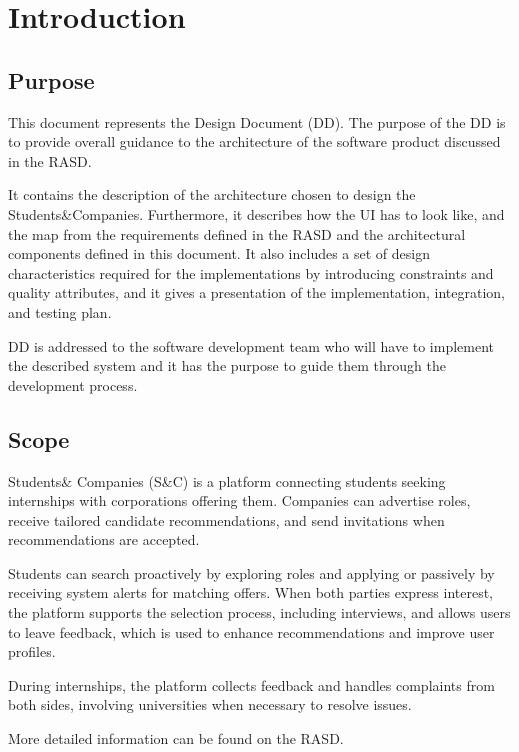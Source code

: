 \chapter{Introduction}

\section{Purpose}
This document represents the Design Document (DD). The purpose of the DD is to provide overall guidance to the architecture of the software product discussed in the RASD.

It contains the description of the architecture chosen to design the Students\&Companies. Furthermore, it describes how the UI has to look like, and the map from the requirements defined in the RASD and the architectural components defined in this document.
It also includes a set of design characteristics required for the implementations by introducing constraints and quality attributes, and it gives a presentation of the implementation, integration, and testing plan.

DD is addressed to the software development team who will have to implement the described system and it has the purpose to guide them through the development process.


\section{Scope}
Students\& Companies (S\&C) is a platform connecting students seeking internships with corporations offering them. Companies can advertise roles, receive tailored candidate recommendations, and send invitations when recommendations are accepted. 

Students can search proactively by exploring roles and applying or passively by receiving system alerts for matching offers. When both parties express interest, the platform supports the selection process, including interviews, and allows users to leave feedback, which is used to enhance recommendations and improve user profiles.

During internships, the platform collects feedback and handles complaints from both sides, involving universities when necessary to resolve issues.

More detailed information can be found on the RASD.

\pagebreak
